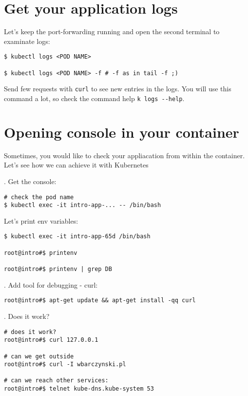 \documentclass[12pt, letterpaper]{article}
\begin{document}
\section{Get your application logs}
Let's keep the port-forwarding running and open the second terminal to examinate logs:

\begin{verbatim}
$ kubectl logs <POD NAME>

$ kubectl logs <POD NAME> -f # -f as in tail -f ;)
\end{verbatim}

Send few requests with \verb|curl| to see new entries in the logs. You will use this command a lot, so check the command help \verb|k logs --help|.

\pagebreak
\section{Opening console in your container}

Sometimes, you would like to check your appliacation from within the container. Let's see how we can achieve it with Kubernetes

. Get the console:

\begin{verbatim}
# check the pod name
$ kubectl exec -it intro-app-... -- /bin/bash
\end{verbatim}

Let's print env variables:

\begin{verbatim}
$ kubectl exec -it intro-app-65d /bin/bash

root@intro#$ printenv

root@intro#$ printenv | grep DB
\end{verbatim}

. Add tool for debugging - curl:

\begin{verbatim}
root@intro#$ apt-get update && apt-get install -qq curl
\end{verbatim}

. Does it work?

\begin{verbatim}
# does it work?
root@intro#$ curl 127.0.0.1

# can we get outside
root@intro#$ curl -I wbarczynski.pl

# can we reach other services:
root@intro#$ telnet kube-dns.kube-system 53
\end{verbatim}
\end{document}
